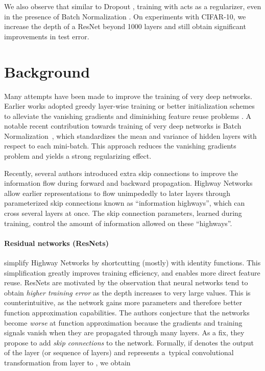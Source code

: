 \documentclass[runningheads]{llncs}
\begin{document}
We also observe that similar to Dropout \cite{srivastava2014dropout}, training with \name{} acts as a regularizer, even in the presence of Batch Normalization \cite{ioffe2015batch}. On experiments with CIFAR-10, we increase the depth of a ResNet beyond 1000 layers and still obtain significant improvements in test error.
 


\section{Background}

\label{sec_related}



Many attempts have been made to improve the training of very deep networks. Earlier works adopted greedy layer-wise training or better initialization schemes
to alleviate the vanishing gradients and diminishing feature reuse problems \cite{fahlman1989cascade,erhan2010does,glorot2010understanding}.
A notable recent contribution towards training of very deep networks is Batch Normalization~\cite{ioffe2015batch}, which standardizes the mean and variance of hidden layers with respect to each mini-batch. This approach reduces the vanishing gradients problem and yields a strong regularizing effect.

Recently, several authors introduced extra skip connections to improve the information flow during forward and backward propagation. Highway Networks \cite{srivastava2015highway} allow earlier representations to flow unimpededly to later layers through parameterized skip connections known as ``information highways'', which can cross several layers at once. The skip connection parameters, learned during training, control the amount of information allowed on these ``highways''.

\paragraph{\textbf{Residual networks (ResNets)}\cite{he2015deep}} simplify Highway Networks by shortcutting (mostly) with identity functions. This simplification greatly improves training efficiency, and enables more direct feature reuse. ResNets are motivated by the observation that neural networks tend to obtain \emph{higher training error} as the depth increases to very large values. This is counterintuitive, as the network gains more parameters and therefore better function approximation capabilities. The authors conjecture that the networks become \emph{worse} at function approximation because the gradients and training signals vanish when they are propagated through many layers. As a fix, they propose to add \emph{skip connections} to the network. Formally, if  denotes the output of the  layer (or sequence of layers) and  represents a\ typical convolutional transformation from layer  to , we obtain
\end{document}
